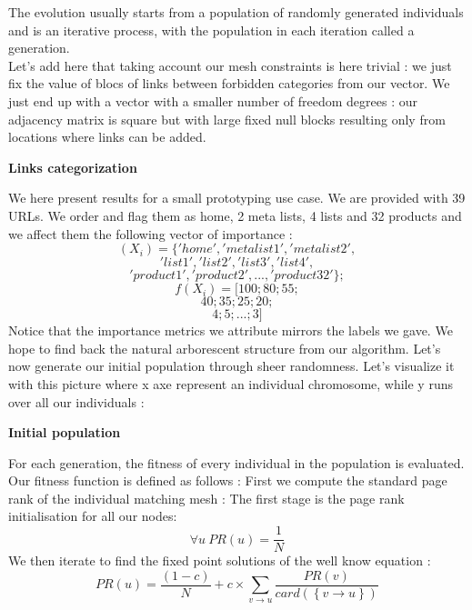 \documentclass{iSWAGArticle}
\begin{document}
The evolution usually starts from a population of randomly generated individuals and is an iterative process, with the population in each iteration called a generation.
\\\newline
Let's add here that taking account our mesh constraints is here trivial : we just fix the value of blocs of links between forbidden categories from our
vector. We just end up with a vector with a smaller number of freedom degrees : our adjacency matrix is square but with large fixed null blocks resulting only from locations where links can be added.
\begin{center}
\textbf{\large Links categorization}
\end{center}
\begin{center}
\end{center}
We here present results for a small prototyping use case.
We are provided with 39 URLs. We order and flag them as home, 2 meta lists, 4 lists and 32 products and we affect them
the following vector of importance :
$$
\left(X_i\right)=\{'home','metalist1','metalist2',
$$
$$
'list1','list2','list3','list4',
$$
$$
'product1','product2',...,'product32'\};
$$
$$
f\left(X_i\right) = [100;80;55;$$
$$
40;35;25;20;
$$
$$
4;5;...;3]
$$
Notice that the importance metrics we attribute mirrors the labels we gave. We hope to find back the natural arborescent structure from our algorithm.
Let's now generate our initial population through sheer randomness. Let's visualize it with this picture where x axe represent an individual chromosome, while y runs over all our individuals :
\begin{center}
\textbf{\large Initial population}
\end{center}
\begin{center}
\end{center}
For each generation, the fitness of every individual in the population is evaluated. Our fitness function is defined as follows :
First we compute the standard page rank of the individual matching mesh :
The first stage is the page rank initialisation for all our nodes:
\begin{equation}
\forall u \ PR\left(u\right)=\frac{1}{N}
\end{equation} 
We then iterate to find the fixed point solutions of the well know equation :
\begin{equation}
PR\left(u\right)= \frac{\left(1-c\right)}{N} + c \times \sum_{v \rightarrow u}\frac{PR\left(v\right)}{card\left(\left\{v\rightarrow u\right\}\right)}
\end{equation}
\end{document}

